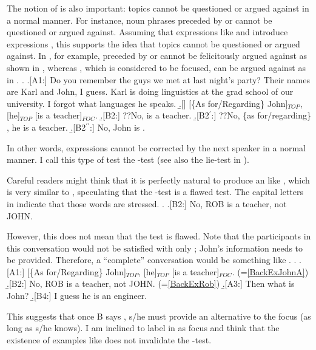 The notion of  is also important:
topics cannot be questioned or argued against in a normal manner.
For instance,
 noun phrases preceded by  or  cannot be questioned or argued against.
Assuming that expressions like  and  introduce  expressions \cite{kuno72,kuno76,gundel74},
this supports the idea that topics cannot be questioned or argued against.
In \Next, for example,
 preceded by  or  cannot be felicitously argued against as shown in \Next[B2,B2$^{\prime}$],
whereas , which is considered to be focused,
can be argued against as in .
%
\ex. \label{BackExJohn}\a.[A1:] Do you remember the guys we met at last night's party?\label{BackExJohnA}
     Their names are Karl and John, I guess.
     Karl is doing linguistics at the grad school of our university.
     I forgot what languages he speaks.
     \b.[] [\{As for/Regarding\} John]$_{TOP}$, [he]$_{TOP}$ [is a teacher]$_{FOC}$.
     \b.[B2:] {}??No,  is a teacher.
     \b.[B2$^{\prime}$:] {}??No, \{as for/regarding\} , he is a teacher.
     \b.[B2$^{\prime\prime}$:] No, John is .

In other words,  expressions cannot be corrected by the next speaker in a normal manner.
I call this type of test the -test
 (see also the lie-test in ).

Careful readers might think that it is perfectly natural to produce an  like \Next ,  which is very similar to \Last[B2],
speculating that the -test is a flawed test.
The capital letters in \Next indicate that
those words are stressed.
%
\ex. \a.[B2:]\label{BackExRob} No, {ROB} is a teacher, not JOHN.

However, this does not mean that the test is flawed.
Note that the participants in this conversation would not be satisfied with only \Last;
John's information needs to be provided.
Therefore, a ``complete'' conversation would be something like \Next.
%
\ex. \a.[A1:] [\{As for/Regarding\} John]$_{TOP}$, [he]$_{TOP}$ [is a teacher]$_{FOC}$. \hfill{(=\ref{BackExJohnA})}
     \b.[B2:] No, {ROB} is a teacher, not JOHN. \hfill{(=\ref{BackExRob})}
     \b.[A3:] Then what is John?
     \b.[B4:] I guess he is an engineer.

This suggests that
once B says , s/he must provide an alternative to the focus (as long as s/he knows).
I am inclined to label  in \Last[B2] as focus
and think that the existence of examples like \LLast[B] does not invalidate the -test.

